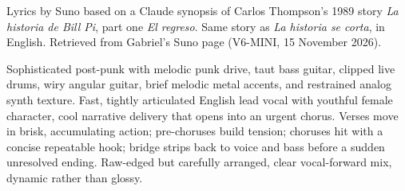 
\begin{notes}
Lyrics by Suno based on a Claude synopsis of Carlos Thompson's 1989 story \emph{La historia de Bill Pi}, part one \emph{El regreso}. Same story as \emph{La historia se corta}, in English. Retrieved from Gabriel's Suno page (V6-MINI, 15 November 2026).
\end{notes}
\begin{style}
Sophisticated post-punk with melodic punk drive, taut bass guitar, clipped live drums, wiry angular guitar, brief melodic metal accents, and restrained analog synth texture. Fast, tightly articulated English lead vocal with youthful female character, cool narrative delivery that opens into an urgent chorus. Verses move in brisk, accumulating action; pre-choruses build tension; choruses hit with a concise repeatable hook; bridge strips back to voice and bass before a sudden unresolved ending. Raw-edged but carefully arranged, clear vocal-forward mix, dynamic rather than glossy.
\end{style}
